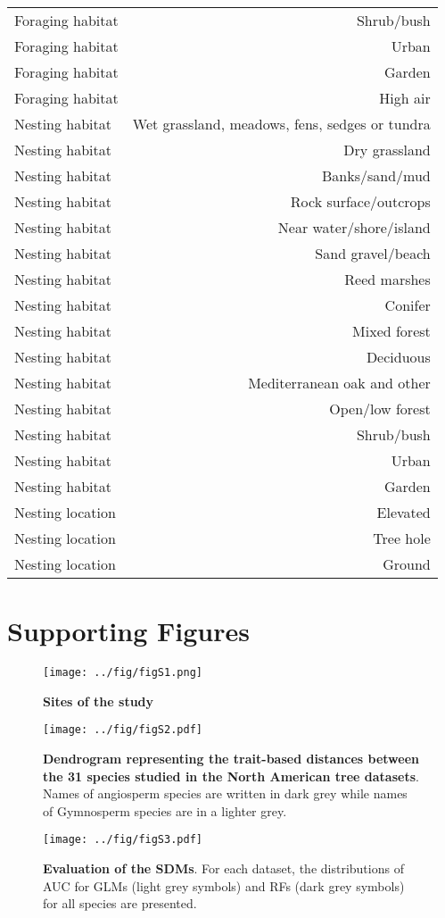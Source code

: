 \begin{longtable}[]{@{}lr@{}}
Foraging habitat & Shrub/bush\tabularnewline
Foraging habitat & Urban\tabularnewline
Foraging habitat & Garden\tabularnewline
Foraging habitat & High air\tabularnewline
Nesting habitat & Wet grassland, meadows, fens, sedges or
tundra\tabularnewline
Nesting habitat & Dry grassland\tabularnewline
Nesting habitat & Banks/sand/mud\tabularnewline
Nesting habitat & Rock surface/outcrops\tabularnewline
Nesting habitat & Near water/shore/island\tabularnewline
Nesting habitat & Sand gravel/beach\tabularnewline
Nesting habitat & Reed marshes\tabularnewline
Nesting habitat & Conifer\tabularnewline
Nesting habitat & Mixed forest\tabularnewline
Nesting habitat & Deciduous\tabularnewline
Nesting habitat & Mediterranean oak and other\tabularnewline
Nesting habitat & Open/low forest\tabularnewline
Nesting habitat & Shrub/bush\tabularnewline
Nesting habitat & Urban\tabularnewline
Nesting habitat & Garden\tabularnewline
Nesting location & Elevated\tabularnewline
Nesting location & Tree hole\tabularnewline
Nesting location & Ground\tabularnewline
\bottomrule
\end{longtable}

\newpage

\section{Supporting Figures}\label{supporting-figures}

\begin{figure}
\centering
\texttt{[image: ../fig/figS1.png]}
\caption{\textbf{Sites of the study}\label{fig:maps}}
\end{figure}

\newpage

\begin{figure}
\centering
\texttt{[image: ../fig/figS2.pdf]}
\caption{\textbf{Dendrogram representing the trait-based distances
between the 31 species studied in the North American tree datasets}.
Names of angiosperm species are written in dark grey while names of
Gymnosperm species are in a lighter grey.\label{fig:dendro}}
\end{figure}

\newpage

\begin{figure}
\centering
\texttt{[image: ../fig/figS3.pdf]}
\caption{\textbf{Evaluation of the SDMs}. For each dataset, the
distributions of AUC for GLMs (light grey symbols) and RFs (dark grey
symbols) for all species are presented.\label{fig:auc}}
\end{figure}

